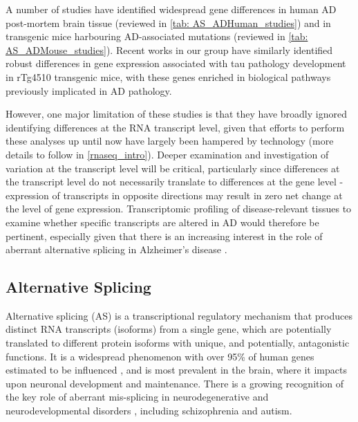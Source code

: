 A number of studies have identified widespread gene differences in human AD post-mortem brain tissue (reviewed in \cref{tab: AS_ADHuman_studies}) and in transgenic mice harbouring AD-associated mutations (reviewed in \cref{tab: AS_ADMouse_studies}). Recent works in our group have similarly identified robust differences in gene expression associated with tau pathology development in rTg4510 transgenic mice, with these genes enriched in biological pathways previously implicated in AD pathology\cite{Castanho2020}. 

However, one major limitation of these studies is that they have broadly ignored identifying differences at the RNA transcript level, given that efforts to perform these analyses up until now have largely been hampered by technology (more details to follow in \cref{rnaseq_intro}). Deeper examination and investigation of variation at the transcript level will be critical, particularly since differences at the transcript level do not necessarily translate to differences at the gene level - expression of transcripts in opposite directions may result in zero net change at the level of gene expression. Transcriptomic profiling of disease-relevant tissues to examine whether specific transcripts are altered in AD would therefore be pertinent, especially given that there is an increasing interest in the role of aberrant alternative splicing in Alzheimer's disease \cite{Raj2018}.

\subsection{Alternative Splicing}\label{intro:AS}
Alternative splicing (AS) is a transcriptional regulatory mechanism that produces distinct RNA transcripts (isoforms) from a single gene, which are potentially translated to different protein isoforms with unique, and potentially, antagonistic functions\cite{Wang2008}. It is a widespread phenomenon with over 95\% of human genes estimated to be influenced \cite{Pan2008}, and is most prevalent in the brain\cite{Yeo2004}, where it impacts upon neuronal development and maintenance\cite{Pan2008, Mazin2014, Raj2015}. There is a growing recognition of the key role of aberrant mis-splicing in neurodegenerative and neurodevelopmental disorders \cite{Gandal2018,RL2019}, including schizophrenia and autism. 

